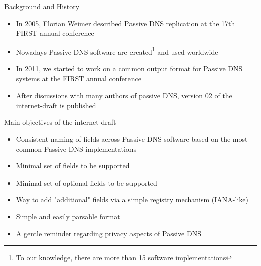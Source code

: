 
\begin{frame}[t,plain]
    \titlepage
\end{frame}

\begin{frame}[t]{Background and History}
\begin{itemize}
\item In 2005, Florian Weimer described Passive DNS replication at the 17th FIRST annual conference
\item Nowadays Passive DNS software are created\footnote{To our knowledge, there are more than 15 software implementations} and used worldwide
\item In 2011, we started to work on a common output format for Passive DNS systems at the FIRST annual conference
\item After discussions with many authors of passive DNS, version 02 of the internet-draft is published
\end{itemize}
\end{frame}

\begin{frame}[t]{Main objectives of the internet-draft}
\begin{itemize}
\item Consistent naming of fields across Passive DNS software based on the most common Passive DNS implementations
\item Minimal set of fields to be supported
\item Minimal set of optional fields to be supported
\item Way to add "additional" fields via a simple registry mechanism (IANA-like)
\item Simple and easily parsable format
\item A gentle reminder regarding privacy aspects of Passive DNS
\end{itemize}
\end{frame}

